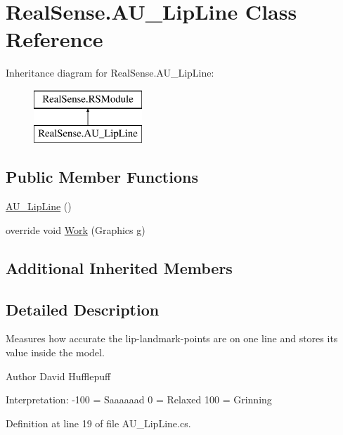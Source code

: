 \hypertarget{class_real_sense_1_1_a_u___lip_line}{}\section{Real\+Sense.\+A\+U\+\_\+\+Lip\+Line Class Reference}
\label{class_real_sense_1_1_a_u___lip_line}
Inheritance diagram for Real\+Sense.\+A\+U\+\_\+\+Lip\+Line\+:\begin{figure}[H]
\begin{center}
\leavevmode
\includegraphics[height=2.000000cm]{class_real_sense_1_1_a_u___lip_line}
\end{center}
\end{figure}
\subsection*{Public Member Functions}
\begin{DoxyCompactItemize}
\item 
\hyperlink{class_real_sense_1_1_a_u___lip_line_a3059aba79e0a4aee393f31503675355f}{A\+U\+\_\+\+Lip\+Line} ()
\item 
override void \hyperlink{class_real_sense_1_1_a_u___lip_line_ac511da241ef7448f552111e3c5365de1}{Work} (Graphics g)
\end{DoxyCompactItemize}
\subsection*{Additional Inherited Members}


\subsection{Detailed Description}
Measures how accurate the lip-\/landmark-\/points are on one line and stores its\textquotesingle{} value inside the model. \begin{DoxyAuthor}{Author}
David  Hufflepuff
\end{DoxyAuthor}
Interpretation\+: -\/100 = Saaaaaad 0 = Relaxed 100 = Grinning 

Definition at line 19 of file A\+U\+\_\+\+Lip\+Line.\+cs.



